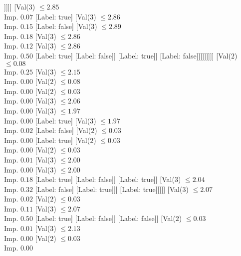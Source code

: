 \documentclass[margin=10pt]{standalone}
\begin{document}
\begin{forest}
											]]]]
							[Val($3$) $ \leq 2.85$ \\ Imp. $0.07$
								[Label: true]
								[Val($3$) $ \leq 2.86$ \\ Imp. $0.15$
									[Label: false]
									[Val($3$) $ \leq 2.89$ \\ Imp. $0.18$
										[Val($3$) $ \leq 2.86$ \\ Imp. $0.12$
											[Val($3$) $ \leq 2.86$ \\ Imp. $0.50$
												[Label: true]
												[Label: false]]
											[Label: true]]
										[Label: false]]]]]]]]]
		[Val($2$) $ \leq 0.08$ \\ Imp. $0.25$
			[Val($3$) $ \leq 2.15$ \\ Imp. $0.00$
				[Val($2$) $ \leq 0.08$ \\ Imp. $0.00$
					[Val($2$) $ \leq 0.03$ \\ Imp. $0.00$
						[Val($3$) $ \leq 2.06$ \\ Imp. $0.00$
							[Val($3$) $ \leq 1.97$ \\ Imp. $0.00$
								[Label: true]
								[Val($3$) $ \leq 1.97$ \\ Imp. $0.02$
									[Label: false]
									[Val($2$) $ \leq 0.03$ \\ Imp. $0.00$
										[Label: true]
										[Val($2$) $ \leq 0.03$ \\ Imp. $0.00$
											[Val($2$) $ \leq 0.03$ \\ Imp. $0.01$
												[Val($3$) $ \leq 2.00$ \\ Imp. $0.00$
													[Val($3$) $ \leq 2.00$ \\ Imp. $0.18$
														[Label: true]
														[Label: false]]
													[Label: true]]
												[Val($3$) $ \leq 2.04$ \\ Imp. $0.32$
													[Label: false]
													[Label: true]]]
											[Label: true]]]]]
							[Val($3$) $ \leq 2.07$ \\ Imp. $0.02$
								[Val($2$) $ \leq 0.03$ \\ Imp. $0.11$
									[Val($3$) $ \leq 2.07$ \\ Imp. $0.50$
										[Label: true]
										[Label: false]]
									[Label: false]]
								[Val($2$) $ \leq 0.03$ \\ Imp. $0.01$
									[Val($3$) $ \leq 2.13$ \\ Imp. $0.00$
										[Val($2$) $ \leq 0.03$ \\ Imp. $0.00$

\end{forest}
\end{document}
